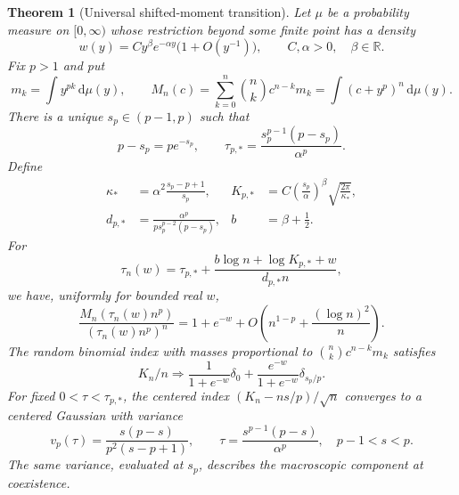 \documentclass[11pt]{article}
\newtheorem{theorem}{Theorem}[section]
\theoremstyle{definition}
\theoremstyle{remark}
\newcommand{\R}{\mathbb R}
\newcommand{\dd}{\,\mathrm d}
\begin{document}
\begin{theorem}[Universal shifted-moment transition]\label{pou:thm:universal}
Let $\mu$ be a probability measure on $[0,\infty)$ whose restriction beyond
some finite point has a density
\begin{equation}\label{pou:eq:generaltail}
 w(y)=Cy^\beta e^{-\alpha y}\bigl(1+O(y^{-1})\bigr),
 \qquad C,\alpha>0,\quad \beta\in\R.
\end{equation}
Fix $p>1$ and put
\[
 m_k=\int y^{pk}\dd\mu(y),\qquad
 M_n(c)=\sum_{k=0}^n\binom nk c^{n-k}m_k
       =\int(c+y^p)^n\dd\mu(y).
\]
There is a unique $s_p\in(p-1,p)$ such that
\begin{equation}\label{pou:eq:generalstar}
 p-s_p=pe^{-s_p},\qquad
 \tau_{p,*}=\frac{s_p^{p-1}(p-s_p)}{\alpha^p}.
\end{equation}
Define
\begin{align}
 \kappa_*&=\alpha^2\frac{s_p-p+1}{s_p},&
 K_{p,*}&=C\left(\frac{s_p}{\alpha}\right)^\beta
                      \sqrt{\frac{2\pi}{\kappa_*}},\label{pou:eq:generalK}\\
 d_{p,*}&=\frac{\alpha^p}{p s_p^{p-2}(p-s_p)},&
 b&=\beta+\frac12.\label{pou:eq:generald}
\end{align}
For
\begin{equation}\label{pou:eq:generalwindow}
 \tau_n(w)=\tau_{p,*}+
       \frac{b\log n+\log K_{p,*}+w}{d_{p,*}n},
\end{equation}
we have, uniformly for bounded real $w$,
\begin{equation}\label{pou:eq:generallimit}
 \frac{M_n(\tau_n(w)n^p)}{(\tau_n(w)n^p)^n}
 =1+e^{-w}
 +O\left(n^{1-p}+\frac{(\log n)^2}{n}\right).
\end{equation}
The random binomial index with masses proportional to
$\binom nk c^{n-k}m_k$ satisfies
\begin{equation}\label{pou:eq:generalmixture}
 K_n/n\Longrightarrow
 \frac1{1+e^{-w}}\delta_0+
 \frac{e^{-w}}{1+e^{-w}}\delta_{s_p/p}.
\end{equation}
For fixed $0<\tau<\tau_{p,*}$, the centered index
$(K_n-ns/p)/\sqrt n$ converges to a centered Gaussian with variance
\begin{equation}\label{pou:eq:generalvariance}
 v_p(\tau)=\frac{s(p-s)}{p^2(s-p+1)},
 \qquad \tau=\frac{s^{p-1}(p-s)}{\alpha^p},\quad p-1<s<p.
\end{equation}
The same variance, evaluated at $s_p$, describes the macroscopic component
at coexistence.
\end{theorem}
\end{document}
